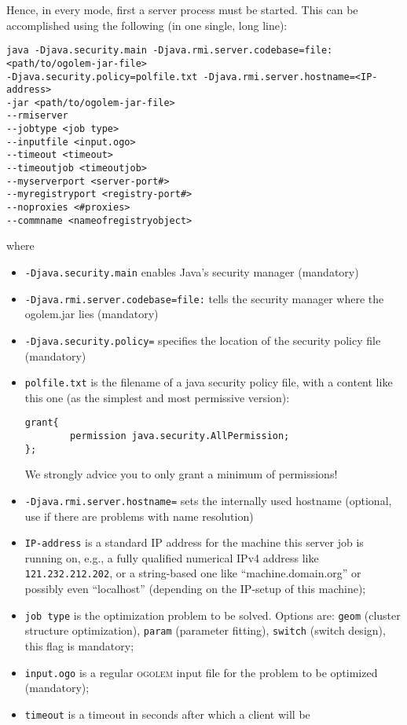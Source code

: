 \documentclass[a4paper,10pt]{scrbook}
\newcommand{\ogo}{\textsc{ogolem}}
\begin{document}
Hence, in every mode, 
first a server process must be started. This can be accomplished using the
following (in one single, long line):
\begin{verbatim}
java -Djava.security.main -Djava.rmi.server.codebase=file:<path/to/ogolem-jar-file> 
-Djava.security.policy=polfile.txt -Djava.rmi.server.hostname=<IP-address> 
-jar <path/to/ogolem-jar-file> 
--rmiserver 
--jobtype <job type> 
--inputfile <input.ogo> 
--timeout <timeout> 
--timeoutjob <timeoutjob> 
--myserverport <server-port#> 
--myregistryport <registry-port#> 
--noproxies <#proxies>
--commname <nameofregistryobject>
\end{verbatim}
where
\begin{itemize}
  \item \texttt{-Djava.security.main} enables Java's security manager (mandatory)
  \item \texttt{-Djava.rmi.server.codebase=file:} tells the security manager where
    the ogolem.jar lies (mandatory)
  \item \texttt{-Djava.security.policy=} specifies the location of the security
    policy file (mandatory)
  \item \texttt{polfile.txt} is the filename of a java security policy file,
    with a content like this one (as the simplest and most permissive version):
\begin{verbatim}
grant{
        permission java.security.AllPermission;
};
\end{verbatim}
    We strongly advice you to only grant a minimum of permissions!
  \item \texttt{-Djava.rmi.server.hostname=} sets the internally used hostname
    (optional, use if there are problems with name resolution)
  \item \texttt{IP-address} is a standard IP address for the machine this
    server job is running on, e.g., a fully qualified numerical IPv4 address
    like \texttt{121.232.212.202}, or a string-based one like
    ``machine.domain.org'' or possibly even ``localhost'' (depending on the
    IP-setup of this machine);
  \item \texttt{job type} is the optimization problem to be solved. Options 
    are: \texttt{geom} (cluster structure optimization), \texttt{param}
    (parameter fitting), \texttt{switch} (switch design), this flag is
    mandatory;
  \item \texttt{input.ogo} is a regular \ogo{} input file for the problem to
    be optimized (mandatory);
  \item \texttt{timeout} is a timeout in seconds after which a client will be 

\end{itemize}
\end{document}
